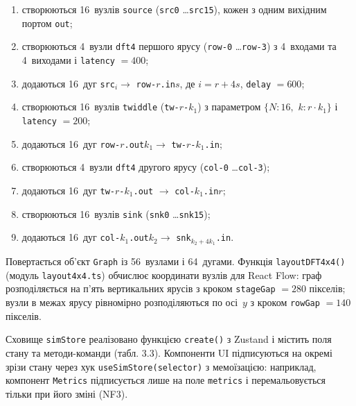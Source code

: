 \documentclass[
]{article}
\begin{document}
\begin{enumerate}
\def\labelenumi{\arabic{enumi}.}
\item
  створюються 16~вузлів \texttt{source} (\texttt{src0}
  \ldots{}\texttt{src15}), кожен з одним вихідним портом \texttt{out};
\item
  створюються 4~вузли \texttt{dft4} першого ярусу (\texttt{row-0}
  \ldots{}\texttt{row-3}) з 4~входами та 4~виходами і \texttt{latency}
  \(= 400\);
\item
  додаються 16~дуг \texttt{src}\(_{i} \rightarrow\)
  \texttt{row}\texttt{-}\(r\)\texttt{.in}\(s\), де \(i = r + 4s\),
  \texttt{delay} \(= 600\);
\item
  створюються 16~вузлів \texttt{twiddle}
  (\texttt{tw}\texttt{-}\(r\)\texttt{-}\(k_{1}\)) з параметром
  \(\{ N:16,\mspace{6mu} k:r \cdot k_{1}\}\) і \texttt{latency}
  \(= 200\);
\item
  додаються 16~дуг
  \texttt{row}\texttt{-}\(r\)\texttt{.out}\(k_{1} \rightarrow\)
  \texttt{tw}\texttt{-}\(r\)\texttt{-}\(k_{1}\)\texttt{.in};
\item
  створюються 4~вузли \texttt{dft4} другого ярусу (\texttt{col-0}
  \ldots{}\texttt{col-3});
\item
  додаються 16~дуг
  \texttt{tw}\texttt{-}\(r\)\texttt{-}\(k_{1}\)\texttt{.out}
  \(\rightarrow\) \texttt{col}\texttt{-}\(k_{1}\)\texttt{.in}\(r\);
\item
  створюються 16~вузлів \texttt{sink} (\texttt{snk0}
  \ldots{}\texttt{snk15});
\item
  додаються 16~дуг
  \texttt{col}\texttt{-}\(k_{1}\)\texttt{.out}\(k_{2} \rightarrow\)
  \texttt{snk}\(_{k_{2} + 4k_{1}}\)\texttt{.in}.
\end{enumerate}

Повертається об'єкт \texttt{Graph} із 56~вузлами і 64~дугами. Функція
\texttt{layoutDFT4x4()} (модуль \texttt{layout4x4.ts}) обчислює
координати вузлів для React Flow: граф розподіляється на п'ять
вертикальних ярусів з кроком \texttt{stageGap} \(= 280\) пікселів; вузли
в межах ярусу рівномірно розподіляються по осі~\(y\) з кроком
\texttt{rowGap} \(= 140\) пікселів.

Сховище \texttt{simStore} реалізовано функцією
\texttt{create}\texttt{()} з Zustand і містить поля стану та
методи-команди (табл. 3.3). Компоненти UI підписуються на окремі зрізи
стану через хук
\texttt{useSimStore}\texttt{(}\texttt{selector}\texttt{)} з мемоїзацією:
наприклад, компонент \texttt{Metrics} підписується лише на поле
\texttt{metrics} і перемальовується тільки при його зміні (NF3).
\end{document}
